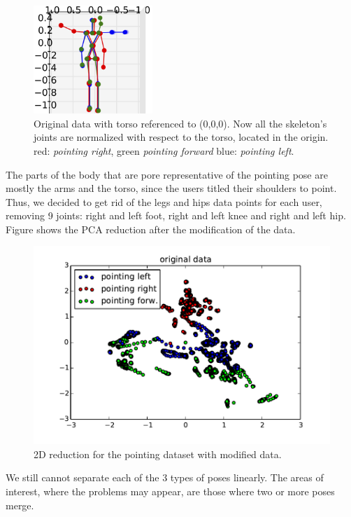 \begin{figure}[h]
\includegraphics[width=4.5cm]{Figures/origin_poses_mod}
\centering
\caption[Original data with torso referenced to (0,0,0)]{Original data with torso referenced to (0,0,0). Now all the skeleton's joints are normalized with respect to the torso, located in the origin. red: \emph{pointing right}, green \emph{pointing forward} blue: \emph{pointing left}. \label{fig:origin_poses_mod}}
\end{figure}

The parts of the body that are pore representative of the pointing pose are mostly the arms and the torso, since the users titled their shoulders to point. Thus, we decided to get rid of the legs and hips data points for each user, removing 9 joints: right and left foot, right and left knee and right and left hip. Figure \label{fig:pca} shows the PCA reduction after the modification of the data.

\begin{figure}[h]
\includegraphics[width=14cm]{Figures/exp03_centered}
\centering
\caption{2D reduction for the pointing dataset with modified data. \label{fig:pca}}
\end{figure}

We still cannot separate each of the 3 types of poses linearly. The areas of interest, where the problems may appear, are those where two or more poses merge. 

